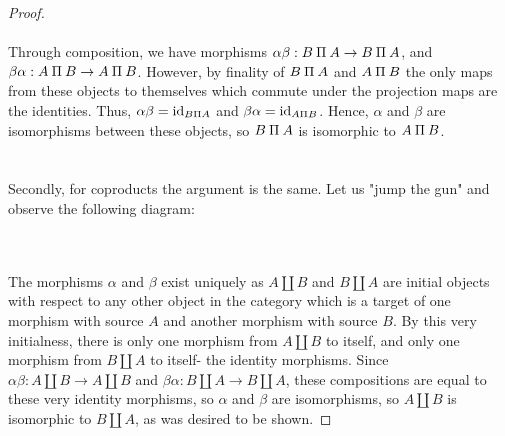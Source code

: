 \documentclass[12pt,letterpaper]{article}
\newcommand{\invamalg}{\mathbin{\text{\rotatebox[origin=c]{180}{$\amalg$}}}}
\begin{document}
\begin{proof}
\\\\
	Through composition, we have morphisms $\alpha\beta : B\invamalg A \rightarrow B\invamalg A$, and $\beta\alpha : A\invamalg B \rightarrow A\invamalg B$. However, by finality of $B\invamalg A$ and $A\invamalg B$ the only maps from these objects to themselves which commute under the projection maps are the identities. Thus, $\alpha\beta = \mathrm{id}_{B\invamalg A}$ and  $\beta\alpha = \mathrm{id}_{A\invamalg B}$. Hence, $\alpha$ and $\beta$ are isomorphisms between these objects, so $B\invamalg A$ is isomorphic to $A\invamalg B$.\\\\\\
	
	\pagebreak
	Secondly, for coproducts the argument is the same. Let us "jump the gun" and observe the following diagram:\\
	\\\\
	
	The morphisms $\alpha$ and $\beta$ exist uniquely as $A\amalg B$ and $B\amalg A$ are initial objects with respect to any other object in the category which is a target of one morphism with source $A$ and another morphism with source $B$. By this very initialness, there is only one morphism from $A\amalg B$ to itself, and only one morphism from $B \amalg A$ to itself- the identity morphisms. Since $\alpha\beta : A\amalg B \rightarrow A\amalg B$ and $\beta\alpha : B\amalg A \rightarrow B\amalg A$, these compositions are equal to these very identity morphisms, so $\alpha$ and $\beta$ are isomorphisms, so $A\amalg B$ is isomorphic to $B\amalg A$, as was desired to be shown.
	
\end{proof}
\end{document}
